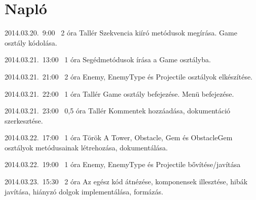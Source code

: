 %
\section{Napló}

\begin{naplo}

\bejegyzes
{2014.03.20.~9:00~} %
{2 óra} %
{Tallér} %
{Szekvencia kiíró metódusok megírása. Game osztály kódolása.}

\bejegyzes
{2014.03.21.~13:00~}
{1 óra}
{\vantal}
{Segédmetódusok írása a Game osztályba.}

\bejegyzes
{2014.03.21.~21:00~}
{2 óra}
{\vantal}
{Enemy, EnemyType és Projectile osztályok elkészítése.}

\bejegyzes
{2014.03.21.~22:00~} %
{1 óra} %
{Tallér} %
{Game osztály befejezése. Menü befejezése.}

\bejegyzes
{2014.03.21.~23:00~} %
{0,5 óra} %
{Tallér} %
{Kommentek hozzáadása, dokumentáció szerkesztése.}

\bejegyzes
{2014.03.22.~17:00~} %
{1 óra} %
{Török} %
{A Tower, Obstacle, Gem és ObstacleGem osztályok metódusainak létrehozása, dokumentálása.}

\bejegyzes
{2014.03.22.~19:00~}
{1 óra}
{\vantal}
{Enemy, EnemyType és Projectile bővítése/javítása}

\bejegyzes
{2014.03.23.~15:30~}
{2 óra}
{\vantal}
{Az egész kód átnézése, komponensek illesztése, hibák javítása, hiányzó dolgok implementálása, formázás.}


\end{naplo}

